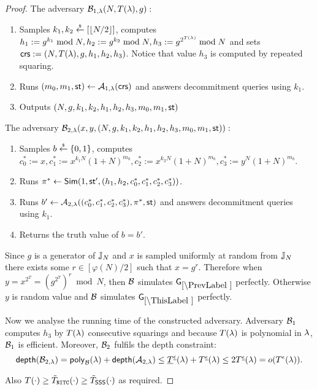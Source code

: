 \begin{proof}
The adversary $\mathcal{B}_{1,\lambda}(N, T(\lambda), g):$
\vspace{-2mm}
\begin{enumerate}
\item Samples $k_1, k_2 \stackrel{{\scriptscriptstyle\$}}{\leftarrow} [\left\lfloor N/2 \right\rfloor]$, computes $h_1 := g^{k_1} \bmod N, h_2 := g^{k_2} \bmod N,  h_3 := g^{2^{T(\lambda)}} \bmod N$ and sets $\mathsf{crs}:=(N, T(\lambda), g, h_1, h_2, h_3)$. Notice that value $h_3$ is computed by repeated squaring.
\item Runs $(m_0, m_1, \mathsf{st}) \leftarrow \mathcal{A}_{1, \lambda}(\mathsf{crs})$ and answers decommitment queries using $k_1$.
\item Outputs $(N,g,k_1, k_2, h_1,h_2,h_3, m_0, m_1, \mathsf{st})$
\end{enumerate}

The adversary $\mathcal{B}_{2,\lambda}(x,y,(N,g,k_1, k_2, h_1,h_2,h_3, m_0, m_1, \mathsf{st})):$
\vspace{-2mm}
\begin{enumerate}
\item Samples $b \stackrel{{\scriptscriptstyle\$}}{\leftarrow} \{0,1\}$, computes $c_0^*:=x, c_1^*:=x^{k_1N}(1+N)^{m_b}, c_2^*:=x^{k_2N}(1+N)^{m_b}, c_3^*:=y^{N}(1+N)^{m_b}$.
\item Runs $\pi^* \leftarrow \mathsf{Sim}(1, \mathsf{st}', (h_1, h_2, c_0^*, c_1^*, c_2^*, c_3^*))$.
\item Runs $b' \leftarrow \mathcal{A}_{2, \lambda}((c_0^*, c_1^*, c_2^*, c_3^*), \pi^*, \mathsf{st})$ and answers decommitment queries using $k_1$.
\item Returns the truth value of $b=b'$.
\end{enumerate}
Since $g$ is a generator of $\mathbb{J}_N$ and $x$ is sampled uniformly at random from $\mathbb{J}_N$ there exists some $r \in [\varphi(N)/2]$ such that $x = g^{r}$. Therefore when $y = x^{2^T} = (g^{2^T})^{r} \bmod N$, then $\mathcal{B}$ simulates $\games_\prevgame$ perfectly. Otherwise $y$ is random value and $\mathcal{B}$ simulates $\games_\thisgame$ perfectly. 

Now we analyse the running time of the constructed adversary. Adversary $\mathcal{B}_1$ computes $h_3$ by $T(\lambda)$ consecutive squarings and because $T(\lambda)$ is polynomial in $\lambda$, $\mathcal{B}_1$ is efficient. Moreover, $\mathcal{B}_2$ fulfils the depth constraint:
\[ \mathsf{depth}(\mathcal{B}_{2,\lambda}) = \mathsf{poly}_{\mathcal{B}}(\lambda) + \mathsf{depth}(\mathcal{A}_{2,\lambda}) \leq \underline{T}^{\underline{\epsilon}}(\lambda) + T^{\underline{\epsilon}}(\lambda) \leq 2 T^{\underline{\epsilon}}(\lambda) = o(T^{\epsilon}(\lambda)). \] 

Also $T(\cdot) \geq \tilde{T}_{\mathtt{NITC}}(\cdot) \geq \tilde{T}_\mathsf{SSS}(\cdot)$ as required.

%





\end{proof}
